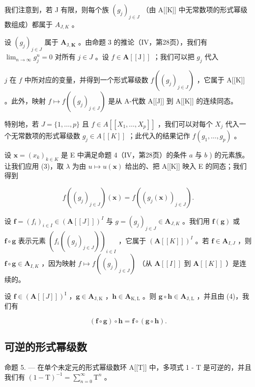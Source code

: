 我们注意到，若 J 有限，则每个族 \((g_{j})_{j\in J}\) （由 A{[}{[}K{]}{]} 中无常数项的形式幂级数组成）都属于 \(A_{J,K}\) 。

设 \((g_j)_{j\in J}\) 属于 \(\mathbf{A}_{\mathrm{J},\mathbf{K}}\) 。由命题 3 的推论（IV，第28页），我们有 \(\lim_{n\to \infty}g_j^n = 0\) 对所有 \(j\in J\) 。设 \(f\in \mathbf{A}[[\mathrm{J}]]\) ；我们可以把 \(g_{j}\) 代入

 \(j\) 在 \(f\) 中所对应的变量，并得到一个形式幂级数 \(f((g_j)_{j \in J})\) ，它属于 A{[}{[}K{]}{]} 。此外，映射 \(f \mapsto f((g_j)_{j \in J})\) 是从 A-代数 A{[}{[}J{]}{]} 到 A{[}{[}K{]}{]} 的连续同态。

特别地，若 \(J = \{1, \ldots, p\}\) 且 \(f \in A[[X_1, \ldots, X_p]]\) ，我们可以对每个 \(X_j\) 代入一个无常数项的形式幂级数 \(g_j \in A[[K]]\) ；此代入的结果记作 \(f(g_1, \ldots, g_p)\) 。

设 \(\mathbf{x} = (x_k)_{k\in K}\) 是 E 中满足命题 4（IV，第28页）的条件 \(a\) 与 \(b\) ) 的元素族。让我们应用 (3)，取 \(\lambda\) 为由 \(u\mapsto u(\mathbf{x})\) 给出的、把 A{[}{[}K{]}{]} 映入 E 的同态；我们得到

\[
f \left(\left(g _ {j}\right) _ {j \in J}\right) (\mathbf {x}) = f \left(\left(g _ {j} (\mathbf {x})\right) _ {j \in J}\right).\tag{4}
\]

设 \(\mathbf{f} = (f_i)_{i\in I}\in (\mathbf{A}[[J]])^I\) 与 \(g = (g_j)_{j\in J}\in \mathbf{A}_{J,K}\) 。我们用 \(\mathbf{f}(\mathbf{g})\) 或 \(\mathbf{f}\circ \mathbf{g}\) 表示元素 \((f_{i}((g_{j})_{j\in J}))_{i\in I}\) ，它属于 \((\mathbf{A}[[K]])^I\) 。若 \(\mathbf{f}\in \mathbf{A}_{I,J}\) ，则 \(\mathbf{f}\circ \mathbf{g}\in \mathbf{A}_{I,K}\) ，因为映射 \(f\mapsto f((g_j)_{j\in J})\) （从 \(\mathbf{A}[[I]]\) 到 \(\mathbf{A}[[K]]\) ）是连续的。

设 \(\mathbf{f} \in (\mathbf{A}[[J]])^{\mathrm{I}}\) ，\(\mathbf{g} \in \mathbf{A}_{\mathrm{J},\mathrm{K}}\) ，\(\mathbf{h} \in \mathbf{A}_{\mathrm{K},\mathrm{L}}\) 。则 \(\mathbf{g} \circ \mathbf{h} \in \mathbf{A}_{\mathrm{J},\mathrm{L}}\) ，并且由 (4)，我们有

\[
(\mathbf {f} \circ \mathbf {g}) \circ \mathbf {h} = \mathbf {f} \circ (\mathbf {g} \circ \mathbf {h}).\tag{5}
\]

\subsection{可逆的形式幂级数}

命题 5. --- 在单个未定元的形式幂级数环 A{[}{[}T{]}{]} 中，多项式 1 - T 是可逆的，并且我们有 \((1 - \mathrm{T})^{-1} = \sum_{n=0}^{\infty} \mathrm{T}^{n}\) 。


